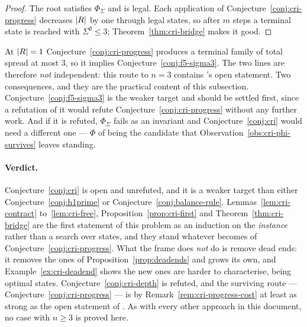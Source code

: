 \begin{proof}
The root satisfies $\Phi_\Sigma$ and is legal. Each application of
Conjecture~\ref{conj:cri-progress} decreases $\left\lvert R\right\rvert$ by one through legal
states, so after $m$ steps a terminal state is reached with
$\Sigma^{\emptyset} \le 3$; Theorem~\ref{thm:cri-bridge} makes it good.
\end{proof}

\begin{remark}
\label{rem:cri-progress-cost}
At $\left\lvert R\right\rvert = 1$ Conjecture~\ref{conj:cri-progress} produces a terminal family of
total spread at most $3$, so it implies Conjecture~\ref{conj:f5-sigma3}. The two
lines are therefore \emph{not} independent: this route to $n = 3$ contains
's open statement. Two consequences, and they are the
practical content of this subsection. Conjecture~\ref{conj:f5-sigma3} is the
weaker target and should be settled first, since a refutation of it would refute
Conjecture~\ref{conj:cri-progress} without any further work. And if it is
refuted, $\Phi_\Sigma$ fails as an invariant and Conjecture~\ref{conj:cri} would
need a different one --- $\Phi$ of  being the candidate
that Observation~\ref{obs:cri-phi-survives} leaves standing.
\end{remark}

\paragraph{Verdict.} Conjecture~\ref{conj:cri} is open and unrefuted, and it is a
weaker target than either Conjecture~\ref{conj:h1prime} or
Conjecture~\ref{conj:balance-rule}. Lemmas~\ref{lem:cri-contract}
to~\ref{lem:cri-free}, Proposition~\ref{prop:cri-first} and
Theorem~\ref{thm:cri-bridge} are the first statement of this problem as an
induction on the \emph{instance} rather than a search over states, and they stand
whatever becomes of Conjecture~\ref{conj:cri-progress}. What the frame does
\emph{not} do is remove dead ends: it removes the ones of
Proposition~\ref{prop:deadends} and grows its own, and
Example~\ref{ex:cri-deadend} shows the new ones are harder to characterise, being
optimal states. Conjecture~\ref{conj:cri-depth} is refuted, and the surviving
route --- Conjecture~\ref{conj:cri-progress} --- is by
Remark~\ref{rem:cri-progress-cost} at least as strong as the open statement of
. As with every other approach in this document, no case
with $n \ge 3$ is proved here.
